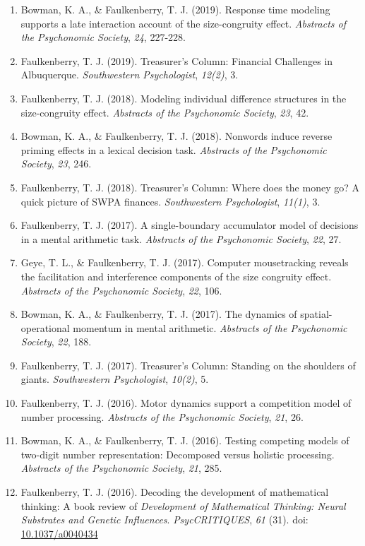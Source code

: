 \documentclass[article,10pt]{article}
\begin{document}
\begin{enumerate}
\item Bowman, K. A., \& Faulkenberry, T. J. (2019). Response time modeling supports a late interaction account of the size-congruity effect. \emph{Abstracts of the Psychonomic Society}, \emph{24}, 227-228.
\item Faulkenberry, T. J. (2019). Treasurer's Column: Financial Challenges in Albuquerque. \emph{Southwestern Psychologist}, \emph{12(2)}, 3.
\item Faulkenberry, T. J. (2018). Modeling individual difference structures in the size-congruity effect. \emph{Abstracts of the Psychonomic Society}, \emph{23}, 42.
\item Bowman, K. A., \& Faulkenberry, T. J. (2018). Nonwords induce reverse priming effects in a lexical decision task. \emph{Abstracts of the Psychonomic Society}, \emph{23}, 246.
\item Faulkenberry, T. J. (2018). Treasurer's Column: Where does the money go? A quick picture of SWPA finances. \emph{Southwestern Psychologist}, \emph{11(1)}, 3.
\item Faulkenberry, T. J. (2017). A single-boundary accumulator model of decisions in a mental arithmetic task. \emph{Abstracts of the Psychonomic Society}, \emph{22}, 27.
\item Geye, T. L., \& Faulkenberry, T. J. (2017). Computer mousetracking reveals the facilitation and interference components of the size congruity effect. \emph{Abstracts of the Psychonomic Society}, \emph{22}, 106.
\item Bowman, K. A., \& Faulkenberry, T. J. (2017). The dynamics of spatial-operational momentum in mental arithmetic. \emph{Abstracts of the Psychonomic Society}, \emph{22}, 188.
\item Faulkenberry, T. J. (2017). Treasurer's Column: Standing on the shoulders of giants. \emph{Southwestern Psychologist}, \emph{10(2)}, 5.
\item Faulkenberry, T. J. (2016). Motor dynamics support a competition model of number processing. \emph{Abstracts of the Psychonomic Society}, \emph{21}, 26.
\item Bowman, K. A., \& Faulkenberry, T. J. (2016). Testing competing models of two-digit number representation: Decomposed versus holistic processing. \emph{Abstracts of the Psychonomic Society}, \emph{21}, 285.
\item Faulkenberry, T. J. (2016). Decoding the development of mathematical thinking: A book review of \emph{Development of Mathematical Thinking: Neural Substrates and Genetic Influences}. \emph{PsycCRITIQUES}, \emph{61} (31). doi: \href{http://dx.doi.org/10.1037/a0040434}{10.1037/a0040434}

\end{enumerate}
\end{document}
